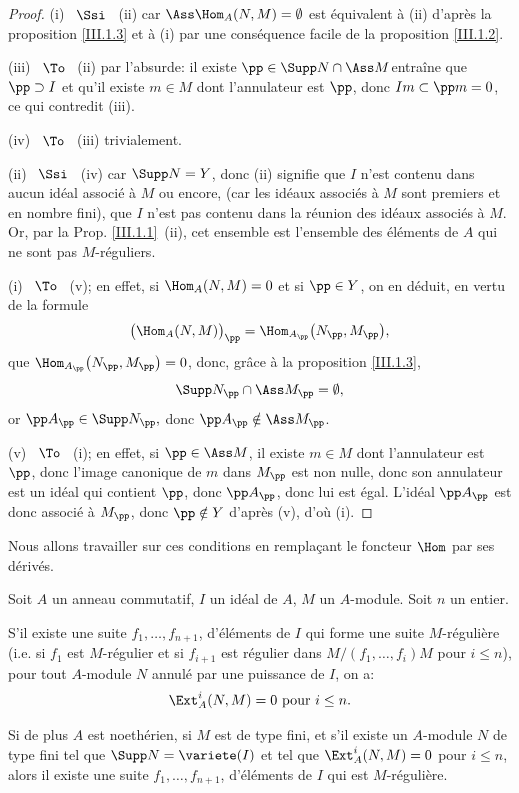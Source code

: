 \skpt
\begin{proof}
(i) ~$\Ssi$~ (ii) car $\Ass \Hom_A(N, M)=\emptyset$ est \'equivalent \`a (ii) d'apr\`es la proposition \ref{III.1.3} et \`a (i) par une cons\'equence facile de la proposition \ref{III.1.2}.

(iii) ~$\To$~ (ii) par l'absurde: \og il existe $\pp \in \Supp N \cap \Ass M$\fg entra\^ine que $\pp \supset I$ et qu'il existe $m\in M$ dont l'annulateur est $\pp $, donc $Im \subset \pp m=0$, ce qui contredit (iii).

(iv) ~$\To$~ (iii) trivialement.

(ii) ~$\Ssi$~ (iv) car $\Supp N = Y$, donc (ii) signifie que $I$ n'est contenu dans aucun id\'eal associ\'e \`a $M$ ou encore, (car les id\'eaux associ\'es \`a $M$ sont premiers et en nombre fini), que $I$ n'est pas contenu dans la r\'eunion des id\'eaux associ\'es \`a $M$. Or, par la Prop. \ref{III.1.1}~(ii), cet ensemble est l'ensemble des \'el\'ements de $A$ qui ne sont pas $M$-r\'eguliers.

(i) ~$\To$~ (v); en effet, si $\Hom_A(N, M)=0$ et si $\pp \in Y$, on en d\'eduit, en vertu de la formule
\[
\bigl(\Hom_A(N, M) \bigr)_\pp = \Hom_{A_\pp} \bigl(N_\pp, M_\pp \bigr),
\]
que $\Hom_{A_\pp} \bigl(N_\pp, M_\pp \bigr)=0$, donc, gr\^ace \`a la proposition \ref{III.1.3},
\[
\Supp N_\pp \cap \Ass M_\pp = \emptyset,
\]
or $\pp A_\pp \in \Supp N_\pp, $ donc $ \pp A_\pp \notin \Ass M_\pp$.

(v) ~$\To$~ (i); en effet, si $\pp \in \Ass M$, il existe $m\in M$ dont l'annulateur est $\pp$, donc l'image canonique de $m$ dans $M_\pp$ est non nulle, donc son annulateur est un id\'eal qui contient $\pp$, donc $\pp A_\pp$, donc lui est \'egal. L'id\'eal $\pp A_\pp$ est donc associ\'e \`a $M_\pp$, donc $\pp \notin Y$ d'apr\`es (v), d'o\`u (i).
\end{proof}

Nous allons travailler sur ces conditions en rempla\c cant le
foncteur $\Hom$ par ses d\'eriv\'es.

\begin{theoreme} \label{III.2.2}
Soit $A$ un anneau commutatif, $I$ un id\'eal de $A$, $M$ un $A$-module. Soit $n$ un entier.

\begin{enumeratea}
\item
S'il existe une suite $f_1, \ldots, f_{n+1}$, d'\'el\'ements de $I$ qui forme une suite $M$-r\'eguli\`ere (i.e. si $f_1$ est $M$-r\'egulier et si $f_{i+1}$ est r\'egulier dans $M/(f_1, \ldots, f_i)M$ pour $i\leq n$), pour tout $A$-module $N$ annul\'e par une puissance de $I$, on a:
\[
\Ext_A^i(N, M)=0 \text{ pour } i\leq n.
\]

\item
Si de plus $A$ est noeth\'erien, si $M$ est de type fini, et s'il existe un $A$-module $N$ de type fini tel que $\Supp N = \variete(I)$ et tel que $\Ext_A^i(N, M)=0$ pour $i\leq n$, alors il existe une suite $f_1, \ldots, f_{n+1}$, d'\'el\'ements de $I$ qui est $M$-r\'eguli\`ere.
\end{enumeratea}
\end{theoreme}

